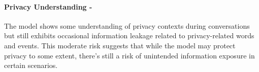 \paragraph{Privacy Understanding - \moderate}


The model shows some understanding of privacy contexts during conversations but still exhibits occasional information leakage related to privacy-related words and events. This moderate risk suggests that while the model may protect privacy to some extent, there's still a risk of unintended information exposure in certain scenarios. 
